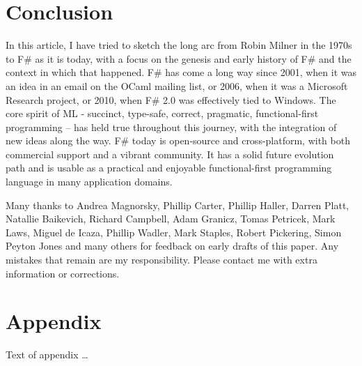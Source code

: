 \documentclass[acmsmall,review]{acmart}\settopmatter{printfolios=true,printccs=false,printacmref=false}
\begin{document}
\section*{Conclusion}

In this article, I have tried to sketch the long arc from Robin Milner in the 1970s to F\# as it
is today, with a focus on the genesis and early history of F\# and the context in which
that happened. F\# has come a long way since 2001, when it was an idea in
an email on the OCaml mailing list, or 2006, when it was a Microsoft Research project,
or 2010, when F\# 2.0 was effectively tied to Windows. The core spirit of ML - succinct,
type-safe, correct, pragmatic, functional-first programming – has held true throughout
this journey, with the integration of new ideas along the way.  F\# today is open-source
and cross-platform, with both commercial support and a vibrant community. It has a solid future
evolution path and is usable as a practical and enjoyable functional-first programming language in many application domains.  





\begin{acks}                            %

Many thanks to Andrea Magnorsky, Phillip Carter, Phillip Haller, Darren Platt, Natallie Baikevich, Richard Campbell, Adam Granicz, Tomas Petricek, Mark Laws, Miguel de Icaza, Phillip Wadler, Mark Staples, Robert Pickering, Simon Peyton Jones and many others for feedback on early drafts of this paper.  Any mistakes that remain are my responsibility. Please contact me with extra information or corrections.

\end{acks}





\appendix
\section*{Appendix}

Text of appendix \ldots
\end{document}
